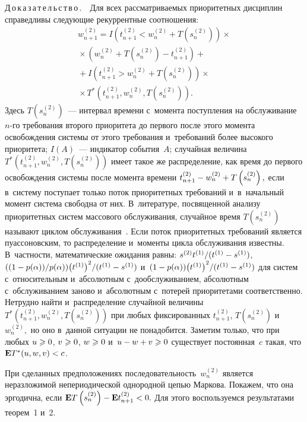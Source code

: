 \begin{multicols}{2}
\noindent
Д\,о\,к\,а\,з\,а\,т\,е\,л\,ь\,с\,т\,в\,о\,.\ \ 
Для всех рассматриваемых приоритетных дисциплин справедливы
сле\-ду\-ющие рекуррентные соотношения:
\begin{multline*}
w_{n+1}^{(2)}=I\left(t_{n+1}^{(2)}<w_{n}^{(2)}+
T\left(s_n^{(2)}\right)\right)\times{}\\
{}\times
\left(w_n^{(2)}+T\left(s_n^{(2)}\right)-t_{n+1}^{(2)}\right)+{}\\
{}+I\left(t_{n+1}^{(2)}>w_{n}^{(2)}+T\left(s_n^{(2)}\right)\right)\times{}\\
{}\times T^{\ast}\left(t_{n+1}^{(2)},
w_n^{(2)},T\left(s_n^{(2)}\right)\right).
\end{multline*}
Здесь $T\left(s_n^{(2)}\right)$~--- интервал времени с~момента
поступления на обслуживание $n$-го требования второго приоритета
до первого после этого момента освобождения сис\-те\-мы от этого
требования и~требований более высокого приоритета; $I(A)$~---
индикатор события~$A$; случайная величина
$T^{\ast}\left(t_{n+1}^{(2)},
w_n^{(2)},T\left(s_n^{(2)}\right)\right)$ имеет такое же
распределение, как время до первого освобождения системы после
момента времени $t_{n+1}^{(2)}\hm-w_n^{(2)}\hm+T\left(s_n^{(2)}\right),$
если в~сис\-те\-му поступает только поток приоритетных требований 
и~в~начальный момент сис\-те\-ма свободна от них. В~литературе,
посвященной анализу приоритетных сис\-тем массового обслуживания,
случайное время $T\left(s_n^{(2)}\right)$ называют циклом
обслуживания~\cite{key-3,key-8}. Если поток приоритетных
требований является пуассоновским, то распределение и~моменты
цикла обслуживания известны. В~част\-ности, математические ожидания
равны:
${s^{(2)}t^{(1)}}/({t^{(1)}\hm-s^{(1)}})$,  
$({(1\hm-p(\alpha))}/{p(\alpha)}){\left(t^{(1)}\right)^2}/({t^{(1)}\hm-s^{(1)}})$ 
и~$(1\hm-p(\alpha)){\left(t^{(1)}\right)^2}/({t^{(1)}\hm-s^{(1)}})$
для сис\-тем с~относительным и~абсолютным с~дообслуживанием,
абсолютным с~обслуживанием заново и~абсолютным с~потерей
приоритетами соответственно. Нетрудно найти и~распределение
случайной величины $T^{\ast}\left(t_{n+1}^{(2)},
w_n^{(2)},T\left(s_n^{(2)}\right)\right)$ при любых фиксированных
$t_{n+1}^{(2)}$, $T\left(s_n^{(2)}\right)$ и~$w_n^{(2)},$ но оно в~данной ситуации
не понадобится. Заметим только, что при любых $u\hm\geqslant 0$, $v\hm\geqslant 0$,
$w\hm\geqslant 0$ и~$u\hm-w\hm+v\hm\geqslant 0$ существует по\-сто\-ян\-ная~$c$ такая, 
что $\mathbf{E} T^{\ast}(u, w, v)\hm<c$.

При сделанных предположениях по\-сле\-до\-ва\-тель\-ность~$w_n^{(2)}$
является неразложимой непериодической однородной цепью Маркова.
Покажем, что она эргодична, если $\mathbf{E} T\left(s_n^{(2)}\right)\hm-\mathbf{E}
t_{n+1}^{(2)}\hm<0.$ Для этого воспользуемся результатами тео\-рем~1 и~2.


\end{multicols}
